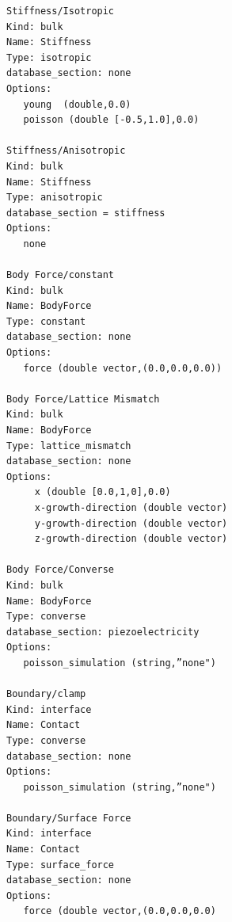 \documentclass[11pt]{article} %
\begin{document}
\begin{verbatim}
Stiffness/Isotropic
Kind: bulk 
Name: Stiffness
Type: isotropic
database_section: none
Options: 
   young  (double,0.0)
   poisson (double [-0.5,1.0],0.0)

Stiffness/Anisotropic
Kind: bulk 
Name: Stiffness
Type: anisotropic
database_section = stiffness 
Options:
   none

Body Force/constant
Kind: bulk 
Name: BodyForce
Type: constant
database_section: none
Options: 
   force (double vector,(0.0,0.0,0.0))

Body Force/Lattice Mismatch
Kind: bulk 
Name: BodyForce
Type: lattice_mismatch
database_section: none
Options:
     x (double [0.0,1,0],0.0)
     x-growth-direction (double vector)
     y-growth-direction (double vector)
     z-growth-direction (double vector)

Body Force/Converse
Kind: bulk 
Name: BodyForce
Type: converse
database_section: piezoelectricity
Options: 
   poisson_simulation (string,”none")

Boundary/clamp
Kind: interface
Name: Contact
Type: converse
database_section: none
Options: 
   poisson_simulation (string,”none")

Boundary/Surface Force
Kind: interface
Name: Contact
Type: surface_force
database_section: none
Options: 
   force (double vector,(0.0,0.0,0.0)

\end{verbatim}
\end{document}
